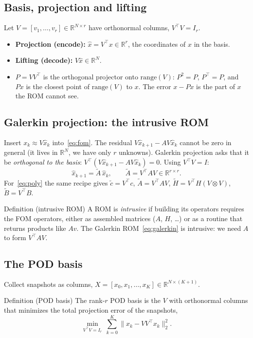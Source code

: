 \documentclass[11pt]{article}
\theoremstyle{remark}\newtheorem{remark}{Remark}
\newcommand{\R}{\mathbb{R}}
\newcommand{\xh}{\hat{x}}
\newcommand{\At}{\tilde{A}}
\begin{document}
\subsection{Basis, projection and lifting}
Let $V=[v_1,\dots,v_r]\in\R^{N\times r}$ have orthonormal columns, $V^\top V=I_r$.
\begin{itemize}[leftmargin=1.5em]
\item \textbf{Projection (encode):} $\xh=V^\top x\in\R^r$, the coordinates of $x$ in the basis.
\item \textbf{Lifting (decode):} $V\xh\in\R^N$.
\item $P=VV^\top$ is the orthogonal projector onto $\mathrm{range}(V)$: $P^2=P$, $P^\top=P$, and $Px$ is the closest point of $\mathrm{range}(V)$ to $x$. The error $x-Px$ is the part of $x$ the ROM cannot see.
\end{itemize}

\subsection{Galerkin projection: the intrusive ROM}\label{sec:galerkin}
Insert $x_k\approx V\xh_k$ into~\eqref{eq:fom}. The residual $V\xh_{k+1}-AV\xh_k$ cannot be zero in general (it lives in $\R^N$, we have only $r$ unknowns). Galerkin projection asks that it be \emph{orthogonal to the basis}: $V^\top(V\xh_{k+1}-AV\xh_k)=0$. Using $V^\top V=I$:
\begin{equation}\label{eq:galerkin}
\xh_{k+1}=\At\,\xh_k,\qquad \At = V^\top A V\in\R^{r\times r}.
\end{equation}
For~\eqref{eq:poly} the same recipe gives $\tilde c=V^\top c$, $\At=V^\top AV$, $\tilde H=V^\top H(V\otimes V)$, $\tilde B=V^\top B$.

\begin{defbox}{Definition (intrusive ROM)}
A ROM is \emph{intrusive} if building its operators requires the FOM operators, either as assembled matrices ($A$, $H$, \dots) or as a routine that returns products like $Av$. The Galerkin ROM~\eqref{eq:galerkin} is intrusive: we need $A$ to form $V^\top AV$.
\end{defbox}

\subsection{The POD basis}\label{sec:pod}
Collect snapshots as columns, $X=[x_0,x_1,\dots,x_K]\in\R^{N\times(K+1)}$.

\begin{defbox}{Definition (POD basis)}
The rank-$r$ POD basis is the $V$ with orthonormal columns that minimizes the total projection error of the snapshots,
\[
\min_{V^\top V=I_r}\ \sum_{k=0}^{K}\|x_k-VV^\top x_k\|_2^2 .
\]
\end{defbox}
\end{document}
